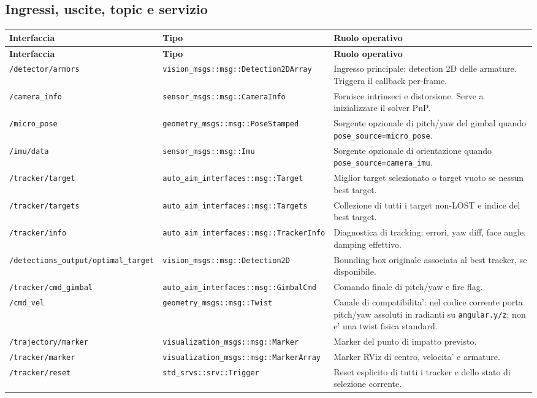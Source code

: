 \documentclass[11pt,a4paper]{article}
\newcommand{\code}[1]{\texttt{#1}}
\newcommand{\topic}[1]{\texttt{#1}}
\begin{document}
\subsection{Ingressi, uscite, topic e servizio}

\begin{longtable}{p{} p{} p{}}
\toprule
\textbf{Interfaccia} & \textbf{Tipo} & \textbf{Ruolo operativo} \\
\midrule
\endfirsthead
\toprule
\textbf{Interfaccia} & \textbf{Tipo} & \textbf{Ruolo operativo} \\
\midrule
\endhead
\topic{/detector/armors} & \code{vision\_msgs::msg::Detection2DArray} & Ingresso principale: detection 2D delle armature. Triggera il callback per-frame. \\
\topic{/camera_info} & \code{sensor\_msgs::msg::CameraInfo} & Fornisce intrinseci e distorsione. Serve a inizializzare il solver PnP. \\
\topic{/micro_pose} & \code{geometry\_msgs::msg::PoseStamped} & Sorgente opzionale di pitch/yaw del gimbal quando \code{pose\_source=micro\_pose}. \\
\topic{/imu/data} & \code{sensor\_msgs::msg::Imu} & Sorgente opzionale di orientazione quando \code{pose\_source=camera\_imu}. \\
\topic{/tracker/target} & \code{auto\_aim\_interfaces::msg::Target} & Miglior target selezionato o target vuoto se nessun best target. \\
\topic{/tracker/targets} & \code{auto\_aim\_interfaces::msg::Targets} & Collezione di tutti i target non-LOST e indice del best target. \\
\topic{/tracker/info} & \code{auto\_aim\_interfaces::msg::TrackerInfo} & Diagnostica di tracking: errori, yaw diff, face angle, damping effettivo. \\
\topic{/detections_output/optimal_target} & \code{vision\_msgs::msg::Detection2D} & Bounding box originale associata al best tracker, se disponibile. \\
\topic{/tracker/cmd_gimbal} & \code{auto\_aim\_interfaces::msg::GimbalCmd} & Comando finale di pitch/yaw e fire flag. \\
\topic{/cmd_vel} & \code{geometry\_msgs::msg::Twist} & Canale di compatibilita': nel codice corrente porta pitch/yaw assoluti in radianti su \code{angular.y/z}; non e' una twist fisica standard. \\
\topic{/trajectory/marker} & \code{visualization\_msgs::msg::Marker} & Marker del punto di impatto previsto. \\
\topic{/tracker/marker} & \code{visualization\_msgs::msg::MarkerArray} & Marker RViz di centro, velocita' e armature. \\
\topic{/tracker/reset} & \code{std\_srvs::srv::Trigger} & Reset esplicito di tutti i tracker e dello stato di selezione corrente. \\
\bottomrule
\end{longtable}
\end{document}
